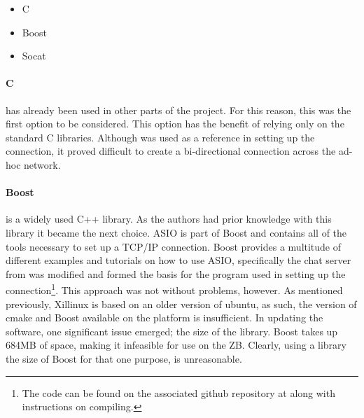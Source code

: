\begin{itemize}
	\item C
	\item Boost
	\item Socat
\end{itemize}


\paragraph*{C}has already been used in other parts of the project.
For this reason, this was the first option to be considered.
This option has the benefit of relying only on the standard C libraries.
Although \cite{beej} was used as a reference in setting up the connection, it proved difficult to create a bi-directional connection across the ad-hoc network.

\paragraph*{Boost}is a widely used C++ library.
As the authors had prior knowledge with this library it became the next choice.
ASIO is part of Boost and contains all of the tools necessary to set up a TCP/IP connection.
Boost provides a multitude of different examples and tutorials on how to use ASIO, specifically the chat server from \cite{boostchat} was modified and formed the basis for the program used in setting up the connection\footnote{The code can be found on the associated github repository at  along with instructions on compiling.}.
This approach was not without problems, however.
As mentioned previously, Xillinux is based on an older version of ubuntu, as such, the version of cmake and Boost available on the platform is insufficient.
In updating the software, one significant issue emerged; the size of the library.
Boost takes up 684MB of space, making it infeasible for use on the ZB.
Clearly, using a library the size of Boost for that one purpose, is unreasonable.


